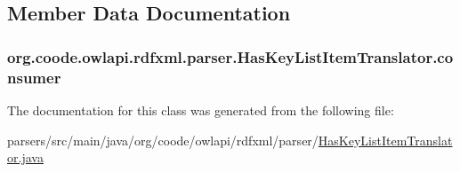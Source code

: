 \subsection{Member Data Documentation}
\hypertarget{classorg_1_1coode_1_1owlapi_1_1rdfxml_1_1parser_1_1_has_key_list_item_translator_aef918fa2971c15b458d9f4413933c9b1}{
\subsubsection[{consumer}]{ org.\-coode.\-owlapi.\-rdfxml.\-parser.\-Has\-Key\-List\-Item\-Translator.\-consumer\hspace{0.3cm}{\ttfamily [private]}}}\label{classorg_1_1coode_1_1owlapi_1_1rdfxml_1_1parser_1_1_has_key_list_item_translator_aef918fa2971c15b458d9f4413933c9b1}


The documentation for this class was generated from the following file\-:\begin{DoxyCompactItemize}
\item 
parsers/src/main/java/org/coode/owlapi/rdfxml/parser/\hyperlink{_has_key_list_item_translator_8java}{Has\-Key\-List\-Item\-Translator.\-java}\end{DoxyCompactItemize}
